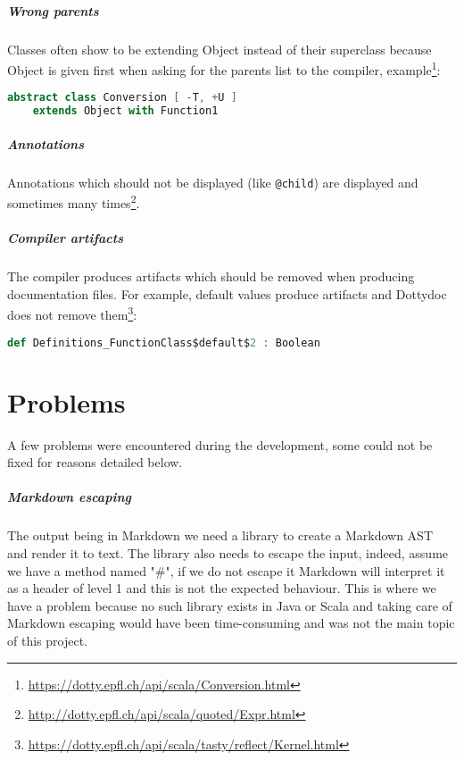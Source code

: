 \documentclass{report}
\begin{document}
\paragraph{Wrong parents}
Classes often show to be extending Object instead of their superclass because Object is given first when asking for the parents list to the compiler, example\footnote{\url{https://dotty.epfl.ch/api/scala/Conversion.html}}:
\begin{lstlisting}[language=scala]
    abstract class Conversion [ -T, +U ]
    extends Object with Function1
\end{lstlisting}

\paragraph{Annotations}
Annotations which should not be displayed (like \texttt{@child}) are displayed and sometimes many times\footnote{\url{http://dotty.epfl.ch/api/scala/quoted/Expr.html}}.

\paragraph{Compiler artifacts}
The compiler produces artifacts which should be removed when producing documentation files. For example, default values produce artifacts and Dottydoc does not remove them\footnote{\url{https://dotty.epfl.ch/api/scala/tasty/reflect/Kernel.html}}:
\begin{lstlisting}[language=scala]
    def Definitions_FunctionClass$default$2 : Boolean
\end{lstlisting}

\chapter{Problems}
\label{sec:problems}
A few problems were encountered during the development, some could not be fixed for reasons detailed below.

\paragraph{Markdown escaping}
The output being in Markdown we need a library to create a Markdown AST and render it to text. The library also needs to escape the input, indeed, assume we have a method named "\#", if we do not escape it Markdown will interpret it as a header of level 1 and this is not the expected behaviour. This is where we have a problem because no such library exists in Java or Scala and taking care of Markdown escaping would have been time-consuming and was not the main topic of this project.
\end{document}

